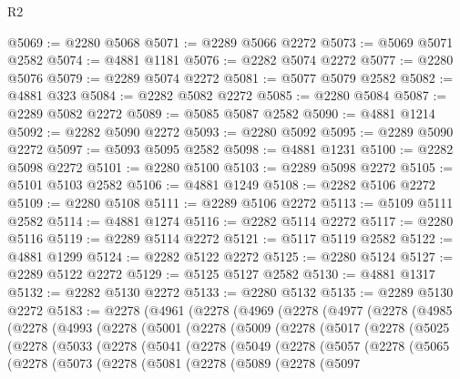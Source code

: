 \begin{lexlean}{R2}
\begin{coremodule}
@5069 := @2280 @5068
@5071 := @2289 @5066 @2272
@5073 := @5069 @5071 @2582
@5074 := @4881 @1181
@5076 := @2282 @5074 @2272
@5077 := @2280 @5076
@5079 := @2289 @5074 @2272
@5081 := @5077 @5079 @2582
@5082 := @4881 @323
@5084 := @2282 @5082 @2272
@5085 := @2280 @5084
@5087 := @2289 @5082 @2272
@5089 := @5085 @5087 @2582
@5090 := @4881 @1214
@5092 := @2282 @5090 @2272
@5093 := @2280 @5092
@5095 := @2289 @5090 @2272
@5097 := @5093 @5095 @2582
@5098 := @4881 @1231
@5100 := @2282 @5098 @2272
@5101 := @2280 @5100
@5103 := @2289 @5098 @2272
@5105 := @5101 @5103 @2582
@5106 := @4881 @1249
@5108 := @2282 @5106 @2272
@5109 := @2280 @5108
@5111 := @2289 @5106 @2272
@5113 := @5109 @5111 @2582
@5114 := @4881 @1274
@5116 := @2282 @5114 @2272
@5117 := @2280 @5116
@5119 := @2289 @5114 @2272
@5121 := @5117 @5119 @2582
@5122 := @4881 @1299
@5124 := @2282 @5122 @2272
@5125 := @2280 @5124
@5127 := @2289 @5122 @2272
@5129 := @5125 @5127 @2582
@5130 := @4881 @1317
@5132 := @2282 @5130 @2272
@5133 := @2280 @5132
@5135 := @2289 @5130 @2272
@5183 := @2278
    (@4961
      (@2278
        (@4969
          (@2278
            (@4977
              (@2278
                (@4985
                  (@2278
                    (@4993
                      (@2278
                        (@5001
                          (@2278
                            (@5009
                              (@2278
                                (@5017
                                  (@2278
                                    (@5025
                                      (@2278
                                        (@5033
                                          (@2278
                                            (@5041
                                              (@2278
                                                (@5049
                                                  (@2278
                                                    (@5057
                                                      (@2278
                                                        (@5065
                                                          (@2278
                                                            (@5073
                                                              (@2278
                                                                (@5081
                                                                  (@2278
                                                                    (@5089
                                                                      (@2278
                                                                        (@5097

\end{coremodule}
\end{lexlean}

